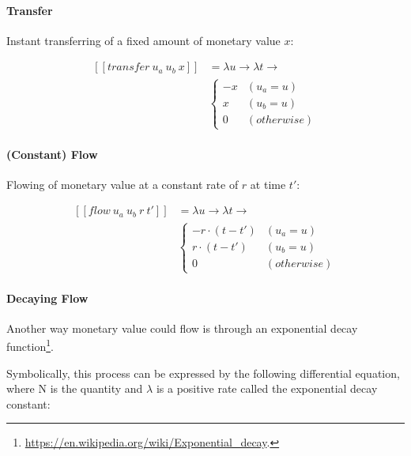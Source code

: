 \paragraph{Transfer}

Instant transferring of a fixed amount of monetary value $x$:

\begin{equation}
    \begin{split}
        [\![transfer\ u_a\ u_b\ x]\!] &=
        \lambda u \rightarrow \lambda t \rightarrow \\
        &\begin{cases}
            -x & (u_a = u) \\
             x & (u_b = u) \\
             0 & (otherwise)
        \end{cases}
    \end{split}
\end{equation}

\paragraph{(Constant) Flow}

Flowing of monetary value at a constant rate of $r$ at time $t'$:

\begin{equation}
    \begin{split}
        [\![flow\ u_a\ u_b\ r\ t']\!] &=
        \lambda u \rightarrow \lambda t \rightarrow \\
        &\begin{cases}
            -r \cdot (t - t') & (u_a = u) \\
             r \cdot (t - t') & (u_b = u) \\
                            0 & (otherwise)
        \end{cases}
    \end{split}
\end{equation}

\paragraph{Decaying Flow}

Another way monetary value could flow is through an exponential decay
function\footnote{\url{https://en.wikipedia.org/wiki/Exponential_decay}.}.

Symbolically, this process can be expressed by the following differential equation, where N is the
quantity and $\lambda$ is a positive rate called the exponential decay constant:

